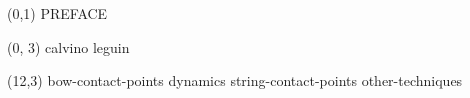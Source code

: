 \documentclass[10pt]{article}
\begin{document}
\begin{textblock}{23}(0,1)
\center\huge PREFACE
\end{textblock}

\begin{textblock}{11}(0, 3)
    {calvino}
    {leguin}
\end{textblock}

\begin{textblock}{11}(12,3)
    {bow-contact-points}
    {dynamics}
    {string-contact-points}
    {other-techniques}
\end{textblock}
\end{document}
